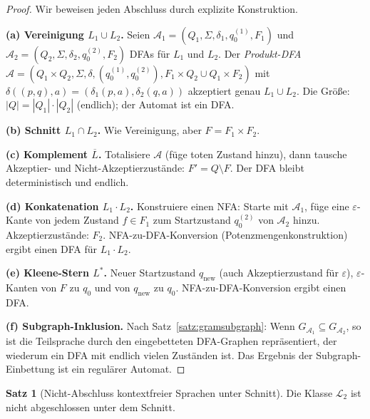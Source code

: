 ﻿\documentclass[a4paper,12pt]{article}
\theoremstyle{definition}
\newtheorem{satz}{Satz}
\begin{document}
\begin{proof}
Wir beweisen jeden Abschluss durch explizite Konstruktion.

\textbf{(a) Vereinigung $L_1 \cup L_2$.}
Seien $\mathcal{A}_1 = (Q_1, \Sigma, \delta_1, q_0^{(1)}, F_1)$ und
$\mathcal{A}_2 = (Q_2, \Sigma, \delta_2, q_0^{(2)}, F_2)$ DFAs f\"ur $L_1$
und $L_2$. Der \emph{Produkt-DFA}
$\mathcal{A} = (Q_1 \times Q_2, \Sigma, \delta, (q_0^{(1)}, q_0^{(2)}),
F_1 \times Q_2 \cup Q_1 \times F_2)$ mit
$\delta((p,q), a) = (\delta_1(p,a), \delta_2(q,a))$
akzeptiert genau $L_1 \cup L_2$.
Die Gr\"o{\ss}e: $|Q| = |Q_1| \cdot |Q_2|$ (endlich); der Automat ist ein DFA.

\textbf{(b) Schnitt $L_1 \cap L_2$.}
Wie Vereinigung, aber $F = F_1 \times F_2$.

\textbf{(c) Komplement $\overline{L}$.}
Totalisiere $\mathcal{A}$ (f\"uge toten Zustand hinzu), dann tausche
Akzeptier- und Nicht-Akzeptierzust\"ande: $F' = Q \setminus F$.
Der DFA bleibt deterministisch und endlich.

\textbf{(d) Konkatenation $L_1 \cdot L_2$.}
Konstruiere einen NFA: Starte mit $\mathcal{A}_1$, f\"uge eine
$\varepsilon$-Kante von jedem Zustand $f \in F_1$ zum Startzustand
$q_0^{(2)}$ von $\mathcal{A}_2$ hinzu. Akzeptierzust\"ande: $F_2$.
NFA-zu-DFA-Konversion (Potenzmengenkonstruktion) ergibt einen DFA f\"ur $L_1 \cdot L_2$.

\textbf{(e) Kleene-Stern $L^*$.}
Neuer Startzustand $q_{\mathrm{new}}$ (auch Akzeptierzustand f\"ur $\varepsilon$),
$\varepsilon$-Kanten von $F$ zu $q_0$ und von $q_{\mathrm{new}}$ zu $q_0$.
NFA-zu-DFA-Konversion ergibt einen DFA.

\textbf{(f) Subgraph-Inklusion.}
Nach Satz~\ref{satz:gramsubgraph}: Wenn $G_{\mathcal{A}_1} \subseteq G_{\mathcal{A}_2}$,
so ist die Teilsprache durch den eingebetteten DFA-Graphen repr\"asentiert,
der wiederum ein DFA mit endlich vielen Zust\"anden ist.
Das Ergebnis der Subgraph-Einbettung ist ein regul\"arer Automat.
\end{proof}

\begin{satz}[Nicht-Abschluss kontextfreier Sprachen unter Schnitt]
\label{satz:kf_schnitt}
Die Klasse $\mathcal{L}_2$ ist nicht abgeschlossen unter dem Schnitt.
\end{satz}
\end{document}
